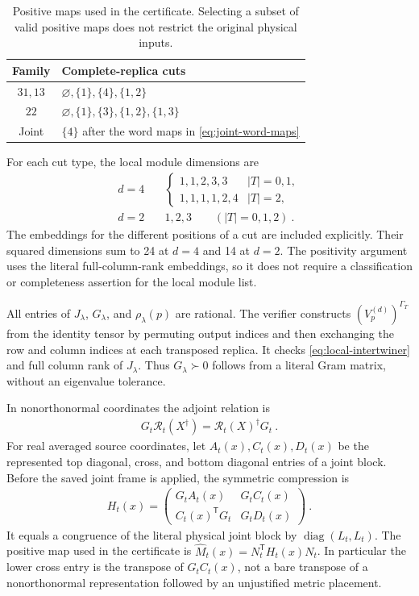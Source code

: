 \documentclass[aps,pra,reprint,superscriptaddress,amsmath,amssymb,floatfix,nofootinbib]{revtex4-2}
\begin{document}
\begin{table}[ht]
\centering
\begin{tabular}{cl}
\toprule
Family & Complete-replica cuts\\
\midrule
$31,13$ & $\varnothing,\{1\},\{4\},\{1,2\}$\\
$22$ & $\varnothing,\{1\},\{3\},\{1,2\},\{1,3\}$\\
Joint & $\{4\}$ after the word maps in \cref{eq:joint-word-maps}\\
\bottomrule
\end{tabular}
\caption{Positive maps used in the certificate. Selecting a subset of
valid positive maps does not restrict the original physical inputs.}
\label{tab:cuts}
\end{table}

For each cut type, the local module dimensions are
\begin{align}
 d=4\quad&
 \begin{cases}
 1,1,2,3,3 & |T|=0,1,\\
 1,1,1,1,2,4 & |T|=2,
 \end{cases}\nonumber\\
 d=2\quad&1,2,3\qquad(|T|=0,1,2)\ .
 \label{eq:local-module-sizes}
\end{align}
The embeddings for the different positions of a cut are included
explicitly. Their squared dimensions sum to 24 at $d=4$ and 14 at $d=2$.
The positivity argument uses the literal full-column-rank embeddings,
so it does not require a classification or completeness assertion for
the local module list.

All entries of $J_\lambda$, $G_\lambda$, and $\rho_\lambda(p)$ are
rational. The verifier constructs $(V_p^{(d)})^{\Gamma_T}$ from the
identity tensor by permuting output indices and then exchanging the
row and column indices at each transposed replica.
It checks \cref{eq:local-intertwiner} and full column rank of $J_\lambda$.
Thus $G_\lambda\succ0$ follows from a literal Gram matrix, without an
eigenvalue tolerance.

In nonorthonormal coordinates the adjoint relation is
\begin{align}
 G_t\mathscr R_t(X^\dagger)
       =\mathscr R_t(X)^\dagger G_t\ .
 \label{eq:metric-adjoint}
\end{align}
For real averaged source coordinates, let $A_t(x),C_t(x),D_t(x)$ be the
represented top diagonal, cross, and bottom diagonal entries of a joint
block. Before the saved joint frame is applied, the symmetric compression
is
\begin{align}
 H_t(x)=
 \begin{pmatrix}
 G_tA_t(x)&G_tC_t(x)\\
 C_t(x)^{\mathsf T}G_t&G_tD_t(x)
 \end{pmatrix}\ .
 \label{eq:joint-metric-block}
\end{align}
It equals a congruence of the literal physical joint block by
$\operatorname{diag}(L_t,L_t)$.
The positive map used in the certificate is
$\widehat M_t(x)=N_t^{\mathsf T}H_t(x)N_t$.
In particular the lower cross entry is the transpose of $G_tC_t(x)$,
not a bare transpose of a nonorthonormal representation followed by an
unjustified metric placement.
\end{document}
